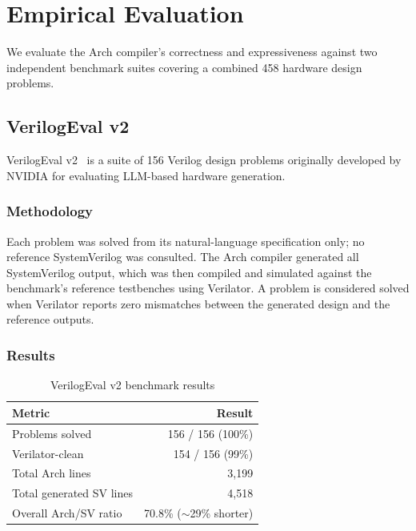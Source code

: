 \documentclass[11pt,twocolumn]{article}
\begin{document}
\section{Empirical Evaluation}\label{sec:benchmark}

We evaluate the Arch compiler's correctness and expressiveness against two independent benchmark suites covering a combined 458 hardware design problems.

\subsection{VerilogEval v2}\label{sec:verilogeval}

VerilogEval v2~\cite{verilogeval} is a suite of 156 Verilog design problems originally developed by NVIDIA for evaluating LLM-based hardware generation.

\subsubsection{Methodology}

Each problem was solved from its natural-language specification only; no reference SystemVerilog was consulted. The Arch compiler generated all SystemVerilog output, which was then compiled and simulated against the benchmark's reference testbenches using Verilator. A problem is considered solved when Verilator reports zero mismatches between the generated design and the reference outputs.

\subsubsection{Results}

\begin{table}[t]
\centering
\caption{VerilogEval v2 benchmark results}
\label{tab:benchmark}
\small
\begin{tabular}{@{}lr@{}}
\toprule
\textbf{Metric} & \textbf{Result} \\
\midrule
Problems solved & 156 / 156 (100\%) \\
Verilator-clean & 154 / 156 (99\%) \\
Total Arch lines & 3,199 \\
Total generated SV lines & 4,518 \\
Overall Arch/SV ratio & 70.8\% (${\sim}$29\% shorter) \\
\bottomrule
\end{tabular}
\end{table}
\end{document}
